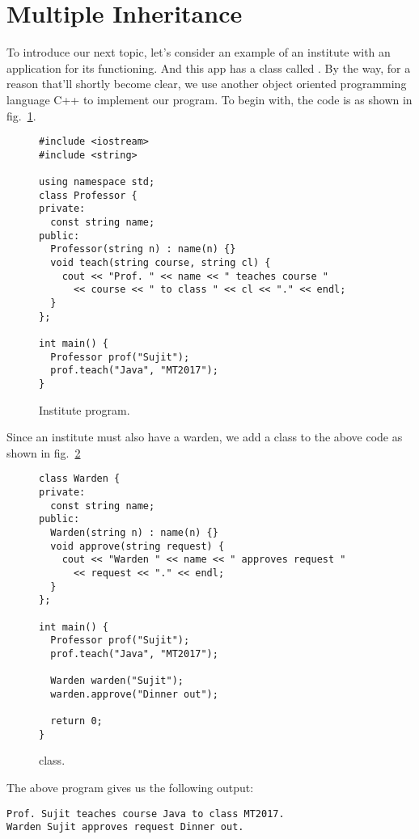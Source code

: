 \documentclass[12pt,a4paper]{article}
\begin{document}
\section{Multiple Inheritance}
To introduce our next topic, let's consider an example of an institute with an application for its functioning. And this app has a class called \lstinline@Professor@. By the way, for a reason that'll shortly become clear, we use another object oriented programming language C++ to implement our program. To begin with, the code is as shown in fig.~\ref{f:ins1}.

\begin{figure}[H]
\begin{lstlisting}[frame=single]
#include <iostream>
#include <string>

using namespace std;
class Professor {
private:
  const string name;
public:
  Professor(string n) : name(n) {}
  void teach(string course, string cl) {
    cout << "Prof. " << name << " teaches course "
      << course << " to class " << cl << "." << endl;
  }
};

int main() {
  Professor prof("Sujit");
  prof.teach("Java", "MT2017");
}
\end{lstlisting}
\caption{Institute program.}
\label{f:ins1}
\end{figure}

Since an institute must also have a warden, we add a \lstinline@Warden@ class to the above code as shown in fig.~\ref{f:ins2}

\begin{figure}[H]
\begin{lstlisting}[frame=single]
class Warden {
private:
  const string name;
public:
  Warden(string n) : name(n) {}
  void approve(string request) {
    cout << "Warden " << name << " approves request "
      << request << "." << endl;
  }
};

int main() {
  Professor prof("Sujit");
  prof.teach("Java", "MT2017");

  Warden warden("Sujit");
  warden.approve("Dinner out");

  return 0;
}
\end{lstlisting}
\caption{\lstinline@Warden@ class.}
\label{f:ins2}
\end{figure}

The above program gives us the following output:

\begin{lstlisting}[frame=single]
Prof. Sujit teaches course Java to class MT2017.
Warden Sujit approves request Dinner out.
\end{lstlisting}
\end{document}
